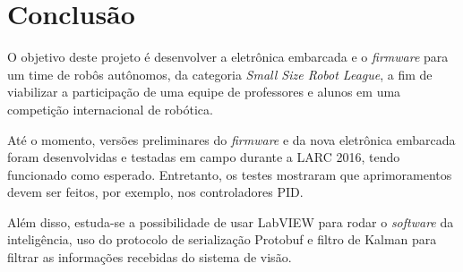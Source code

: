 \chapter{Conclusão}\label{cap:conclusao}

%
%
%
%


O objetivo deste projeto é desenvolver a eletrônica embarcada e o \textit{firmware} para um time de robôs autônomos, da categoria \textit{Small Size Robot League}, a fim de viabilizar a participação de uma equipe de professores e alunos em uma competição internacional de robótica.

Até o momento, versões preliminares do \textit{firmware} e da nova eletrônica embarcada foram desenvolvidas e testadas em campo durante a LARC 2016, tendo funcionado como esperado. Entretanto, os testes mostraram que aprimoramentos devem ser feitos, por exemplo, nos controladores PID.

Além disso, estuda-se a possibilidade de usar LabVIEW\textsuperscript{\texttrademark} para rodar o \textit{software} da inteligência, uso do protocolo de serialização Protobuf\cite{protobufdocs} e filtro de Kalman para filtrar as informações recebidas do sistema de visão. 

